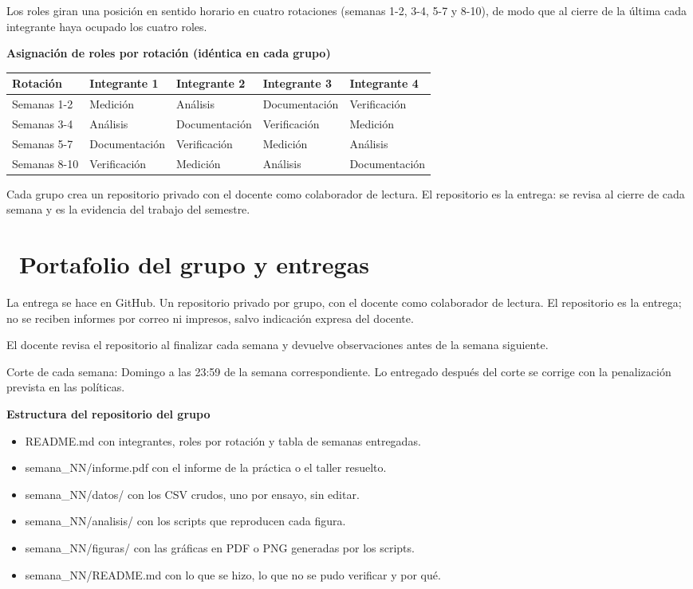 \documentclass[11pt,a4paper]{article}
\newcommand{\iconotexto}[2]{\textcolor{cyanNeon}{\faIcon{#1}}~#2}
\begin{document}
Los roles giran una posición en sentido horario en cuatro rotaciones (semanas 1-2, 3-4, 5-7 y 8-10), de modo que al cierre de la última cada integrante haya ocupado los cuatro roles.

\textbf{Asignación de roles por rotación (idéntica en cada grupo)}

\begin{tabularx}{\linewidth}{@{}l X X X X@{}}
\toprule
Rotación & Integrante 1 & Integrante 2 & Integrante 3 & Integrante 4 \\
\midrule
Semanas 1-2 & Medición & Análisis & Documentación & Verificación \\
Semanas 3-4 & Análisis & Documentación & Verificación & Medición \\
Semanas 5-7 & Documentación & Verificación & Medición & Análisis \\
Semanas 8-10 & Verificación & Medición & Análisis & Documentación \\
\bottomrule
\end{tabularx}

Cada grupo crea un repositorio privado con el docente como colaborador de lectura. El repositorio es la entrega: se revisa al cierre de cada semana y es la evidencia del trabajo del semestre.

\section{\iconotexto{code-branch}{Portafolio del grupo y entregas}}

La entrega se hace en GitHub. Un repositorio privado por grupo, con el docente como colaborador de lectura. El repositorio es la entrega; no se reciben informes por correo ni impresos, salvo indicación expresa del docente.

El docente revisa el repositorio al finalizar cada semana y devuelve observaciones antes de la semana siguiente.

Corte de cada semana: Domingo a las 23:59 de la semana correspondiente. Lo entregado después del corte se corrige con la penalización prevista en las políticas.

\textbf{Estructura del repositorio del grupo}

\begin{itemize}[leftmargin=1.4em,itemsep=2pt,topsep=3pt]
  \item README.md con integrantes, roles por rotación y tabla de semanas entregadas.
  \item semana\_NN/informe.pdf con el informe de la práctica o el taller resuelto.
  \item semana\_NN/datos/ con los CSV crudos, uno por ensayo, sin editar.
  \item semana\_NN/analisis/ con los scripts que reproducen cada figura.
  \item semana\_NN/figuras/ con las gráficas en PDF o PNG generadas por los scripts.
  \item semana\_NN/README.md con lo que se hizo, lo que no se pudo verificar y por qué.
\end{itemize}
\end{document}
